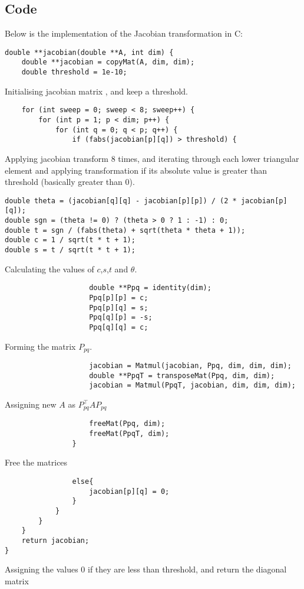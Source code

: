 \documentclass[a4paper,12pt]{article}
\theoremstyle{remark}
\begin{document}
\subsection{Code}
Below is the implementation of the Jacobian transformation in C:
\begin{verbatim}
double **jacobian(double **A, int dim) {
    double **jacobian = copyMat(A, dim, dim);
    double threshold = 1e-10;
\end{verbatim}
Initialising jacobian matrix , and keep a threshold.
\begin{verbatim}
    for (int sweep = 0; sweep < 8; sweep++) {
        for (int p = 1; p < dim; p++) {
            for (int q = 0; q < p; q++) {
                if (fabs(jacobian[p][q]) > threshold) {
\end{verbatim}
Applying jacobian transform 8 times, and iterating through each lower triangular element and applying transformation if its absolute value is greater than threshold (basically greater than 0).
\begin{verbatim}
double theta = (jacobian[q][q] - jacobian[p][p]) / (2 * jacobian[p][q]);
double sgn = (theta != 0) ? (theta > 0 ? 1 : -1) : 0;
double t = sgn / (fabs(theta) + sqrt(theta * theta + 1));
double c = 1 / sqrt(t * t + 1);
double s = t / sqrt(t * t + 1);
\end{verbatim}
Calculating the values of $c$,$s$,$t$ and $\theta$.
\begin{verbatim}
                    double **Ppq = identity(dim);
                    Ppq[p][p] = c;
                    Ppq[p][q] = s;
                    Ppq[q][p] = -s;
                    Ppq[q][q] = c;

\end{verbatim}
Forming the matrix $P_{pq}$.
\begin{verbatim}
                    jacobian = Matmul(jacobian, Ppq, dim, dim, dim);
                    double **PpqT = transposeMat(Ppq, dim, dim);
                    jacobian = Matmul(PpqT, jacobian, dim, dim, dim);
\end{verbatim}
Assigning new $A$ as $P_{pq}^\top A P_{pq}$ 
\begin{verbatim}
                    freeMat(Ppq, dim);
                    freeMat(PpqT, dim);
                }
\end{verbatim}
Free the matrices
\begin{verbatim}
                else{
                	jacobian[p][q] = 0;
                }
            }
        }
    }
    return jacobian;
}
\end{verbatim}
Assigning the values 0 if they are less than threshold, and return the diagonal matrix
\end{document}
